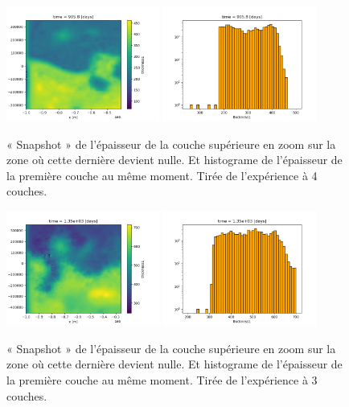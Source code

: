 \documentclass[10pt]{report}
\numberwithin{equation}{section}
\begin{document}
\begin{figure}[!htpb]
\centering
\includegraphics[width=0.45\textwidth]{figures/debuggage/2023_10_16_thickness_closeup.png} \includegraphics[width=0.45\textwidth]{figures/debuggage/2023_10_16_thickness_histo2.png}
\caption{« Snapshot » de l'épaisseur de la couche supérieure en zoom sur la zone où cette dernière devient nulle. Et histograme de l'épaisseur de la première couche au même moment. Tirée de l'expérience à 4 couches.}
\label{fig:thickness-close}
\end{figure}

\begin{figure}[!htpb]
\centering
\includegraphics[width=0.45\textwidth]{figures/debuggage/2023_10_16_thickness_closeup2.png}
\includegraphics[width=0.45\textwidth]{figures/debuggage/2023_10_16_thickness_histo.png}
\caption{ « Snapshot » de l'épaisseur de la couche supérieure en zoom sur la zone où cette dernière devient nulle. Et histograme de l'épaisseur de la première couche au même moment. Tirée de l'expérience à 3 couches.}
\label{fig:thickness-close2}
\end{figure}
\end{document}

